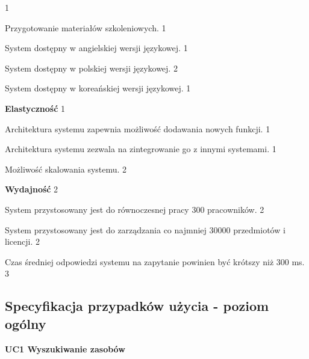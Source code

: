 \begin{myEnumerate}
\begin{myEnumerate}
                  \hfill 1
		\item Przygotowanie materiałów szkoleniowych.
                  \hfill 1
		\item System dostępny w angielskiej wersji językowej.
                  \hfill 1
                \item System dostępny w polskiej wersji językowej.
                  \hfill 2
                \item System dostępny w koreańskiej wersji językowej.
                  \hfill 1
	\end{myEnumerate}
	\item \textbf{Elastyczność}
                  \hfill 1
	\begin{myEnumerate}
		\item Architektura systemu zapewnia możliwość dodawania nowych funkcji.
                  \hfill 1
		\item Architektura systemu zezwala na zintegrowanie go z innymi systemami.
                  \hfill 1
		\item Możliwość skalowania systemu.
                  \hfill 2
	\end{myEnumerate}
	\item \textbf{Wydajność}
                  \hfill 2
	\begin{myEnumerate}
		\item System przystosowany jest do równoczesnej pracy 300 pracowników.
                  \hfill 2
		\item System przystosowany jest do zarządzania co najmniej 30000 przedmiotów i licencji.
                  \hfill 2
		\item Czas średniej odpowiedzi systemu na zapytanie powinien być krótszy niż 300 ms.
                  \hfill 3
	\end{myEnumerate}
\end{myEnumerate}

\subsection{Specyfikacja przypadków użycia - poziom ogólny}

\vspace{.03\textheight}
\begin{center}
  {\Large\bf UC1 Wyszukiwanie zasobów} \\
\end{center}

\vspace{.02\textheight}

